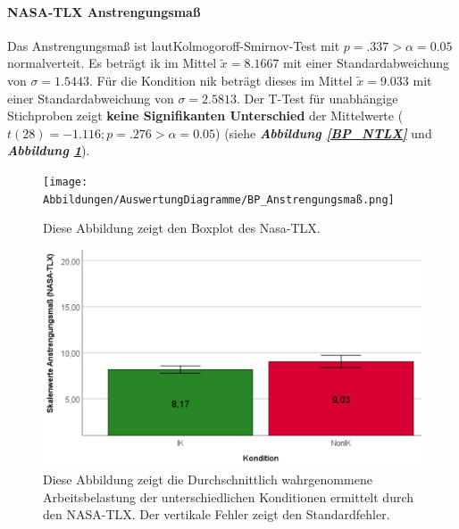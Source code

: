 \documentclass[a4paper,11pt]{article}%
\renewcommand{\\}{\vspace*{0.5\baselineskip} \newline}
\begin{document}
\paragraph{NASA-TLX \dq{}Anstrengungsmaß\dq{}} 
Das Anstrengungsmaß ist laut\newline Kolmogoroff-Smirnov-Test mit $p = .337 > \alpha = 0.05$ normalverteit. 
Es beträgt \ac{ik} im Mittel $\tilde x = 8.1667$ mit einer Standardabweichung von $\sigma = 1.5443$.
Für die Kondition \ac{nik} beträgt dieses im Mittel $\tilde x = 9.033$ mit einer Standardabweichung von $\sigma = 2.5813$. 
Der T-Test für unabhängige Stichproben zeigt \textbf{keine Signifikanten Unterschied} der Mittelwerte ($t(28) = -1.116; p = .276 > \alpha = 0.05$) (siehe \textbf{\textit{Abbildung \ref{BP_NTLX}}} und \textbf{\textit{Abbildung \ref{SD_NTLX_Mittelwerte}}}).

	\begin{figure}[H]
   \begin{minipage}[t]{.5\linewidth} %
      \texttt{[image: Abbildungen/AuswertungDiagramme/BP\_Anstrengungsmaß.png]}
      \caption[Boxplot der Werte des Nasa-TLX]{Diese Abbildung zeigt den Boxplot des Nasa-TLX.}
            \label{BP_NTLX}
   \end{minipage}
   \hspace{.02\linewidth}%
   \begin{minipage}[t]{.5\linewidth} %
     \includegraphics[width=\linewidth]{Abbildungen/AuswertungDiagramme/SD_NTLX_Mittelwerte.png}
      \caption[Durchschnittliche gefühlte Arbeitsbelastung]{Diese Abbildung zeigt die Durchschnittlich wahrgenommene Arbeitsbelastung der unterschiedlichen Konditionen ermittelt durch den NASA-TLX. Der vertikale Fehler zeigt den Standardfehler.}
       \label{SD_NTLX_Mittelwerte}
   \end{minipage}
\end{figure}
\end{document}
